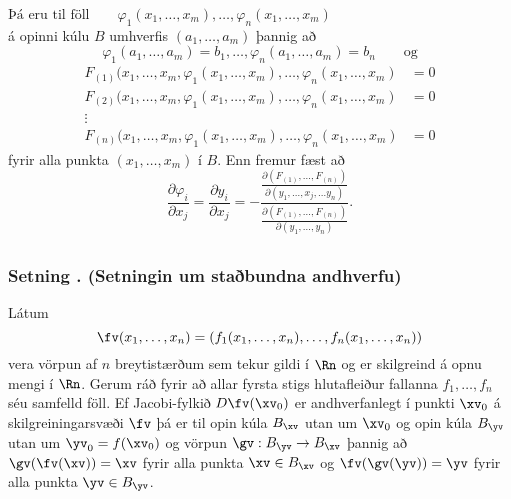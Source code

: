 \subsubsection{}
$\text{Þá eru til föll} \qquad \varphi_1(x_1,\ldots,x_m),\ldots,\varphi_n(x_1,\ldots,x_m)$ \\
á opinni kúlu $B$ umhverfis $(a_1,\ldots,a_m)$
þannig að 
$$\varphi_1(a_1,\ldots,a_m)=b_1,\ldots,\varphi_n(a_1,\ldots,a_m)=b_n \qquad \text{og}$$
\begin{align*}
F_{(1)}(x_1,\ldots,x_m, \varphi_1(x_1,\ldots,x_m),\ldots,
\varphi_n(x_1,\ldots,x_m)&=0\\
F_{(2)}(x_1,\ldots,x_m, \varphi_1(x_1,\ldots,x_m),\ldots,
\varphi_n(x_1,\ldots,x_m)&=0\\
\vdots\\
F_{(n)}(x_1,\ldots,x_m, \varphi_1(x_1,\ldots,x_m),\ldots,
\varphi_n(x_1,\ldots,x_m)&=0
\end{align*}
fyrir alla punkta $(x_1,\ldots,x_m)$ í $B$.
Enn fremur fæst að %
$$\frac{\partial \varphi_i}{\partial x_j}
=\frac{\partial y_i}{\partial x_j}
=-\frac{\frac{\partial(F_{(1)}, \ldots, F_{(n)})}
{\partial( y_1, \ldots,x_j,\ldots y_n)}}
{\frac{\partial(F_{(1)}, \ldots, F_{(n)})}{\partial( y_1, \ldots, y_n)}}.$$






\subsection{} 

\subsubsection{Setning \kaflanr. (Setningin um staðbundna andhverfu)}
Látum $$\fv(x_1,\ldots,
x_n)=(f_1(x_1,\ldots,x_n),\ldots,f_n(x_1,\ldots,x_n))$$ vera vörpun af
$n$ breytistærðum sem tekur gildi í $\Rn$ og er skilgreind á opnu
mengi í $\Rn$.   Gerum ráð fyrir að allar
fyrsta stigs hlutafleiður fallanna $f_1, \ldots, f_n$ séu samfelld
föll.  Ef Jacobi-fylkið $D\fv(\xv_0)$ er andhverfanlegt í punkti
$\xv_0$ á skilgreiningarsvæði $\fv$ þá er til opin kúla $B_{\xv}$ utan
um $\xv_0$ og opin kúla $B_{\yv}$ utan um $\yv_0=f(\xv_0)$ og vörpun
$\gv:B_{\yv}\rightarrow B_{\xv}$ þannig að 
$\gv(\fv(\xv))=\xv$ fyrir alla punkta $\xv\in B_{\xv}$ og 
$\fv(\gv(\yv))=\yv$ fyrir alla punkta $\yv\in B_{\yv}$.






